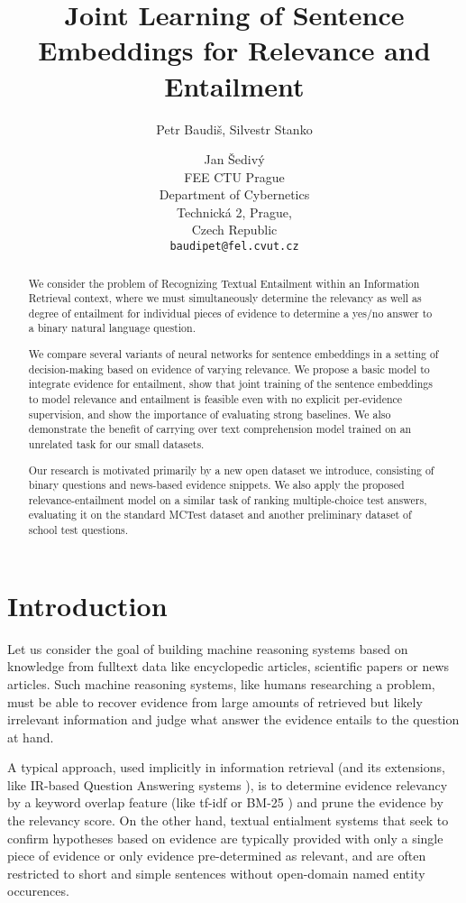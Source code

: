 \documentclass[11pt]{article}
\title{Joint Learning of Sentence Embeddings for Relevance and Entailment}
\author{Petr Baudi\v{s},
	Silvestr Stanko \and
	Jan \v{S}ediv\'{y} \\
	FEE CTU Prague\\
	Department of Cybernetics\\
	Technick\'{a} 2, Prague,\\Czech Republic\\
	{\tt baudipet@fel.cvut.cz}}
\date{}
\begin{document}
\maketitle

\begin{abstract}
	We consider the problem of Recognizing Textual Entailment
	within an Information Retrieval context, where we must simultaneously
	determine the relevancy as well as degree of entailment for individual
	pieces of evidence to determine a yes/no answer to a binary
	natural language question.

	We compare several variants of neural networks for sentence embeddings
	in a setting of decision-making based on evidence of varying relevance.
	We propose a basic model to integrate evidence for entailment,
	show that joint training of the sentence embeddings to model
	relevance and entailment is feasible even with no explicit per-evidence
	supervision, and show the importance of evaluating strong baselines.
	We also demonstrate the benefit of carrying over text comprehension model
	trained on an unrelated task for our small datasets.

	Our research is motivated primarily by a new open dataset we introduce,
	consisting of binary questions and news-based evidence snippets.
	We also apply the proposed relevance-entailment model on a similar task
	of ranking multiple-choice test answers, evaluating it on the standard
	MCTest dataset and another preliminary dataset of school test questions.
\end{abstract}

\section{Introduction}

Let us consider the goal of building machine reasoning systems based
on knowledge from fulltext data like encyclopedic articles, scientific
papers or news articles.
Such machine reasoning systems, like humans researching a problem,
must be able to recover evidence from large amounts of retrieved
but likely irrelevant information and judge what answer the evidence entails
to the question at hand.

A typical approach, used implicitly in information retrieval
(and its extensions, like IR-based Question Answering systems \cite{YodaQAPoster2015}),
is to determine evidence relevancy by a keyword overlap feature (like tf-idf or BM-25 \cite{BM25})
and prune the evidence by the relevancy score.
On the other hand, textual entialment systems that seek to confirm hypotheses
based on evidence \cite{RTE1} \cite{SICK2014} \cite{SNLI}
are typically provided with only a single piece of evidence
or only evidence pre-determined as relevant, and are often restricted
to short and simple sentences without open-domain named entity occurences.
\end{document}
